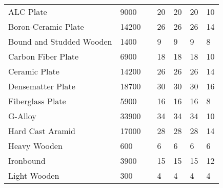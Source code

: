 \documentclass[twoside]{book}
\begin{document}
\begin{longtable}{p{1.25in}llp{3em}p{3em}p{3em}p{3em}}
  \\
  \hline
  \endhead
      
  \raggedright
           ALC Plate 
  &
   9000 
  &
  
  &
   20 
  &
   20 
  &
   20 
  &
   10 
  \tabularnewline
      
  \raggedright
           Boron-Ceramic Plate 
  &
   14200 
  &
  
  &
   26 
  &
   26 
  &
   26 
  &
   14 
  \tabularnewline
      
  \raggedright
           Bound and Studded Wooden
           
  &
   1400 
  &
  
  &
   9 
  &
   9 
  &
   9 
  &
   8 
  \tabularnewline
      
  \raggedright
           Carbon Fiber Plate 
  &
   6900 
  &
  
  &
   18 
  &
   18 
  &
   18 
  &
   10 
  \tabularnewline
      
  \raggedright
           Ceramic Plate 
  &
   14200 
  &
  
  &
   26 
  &
   26 
  &
   26 
  &
   14 
  \tabularnewline
      
  \raggedright
           Densematter Plate 
  &
   18700 
  &
  
  &
   30 
  &
   30 
  &
   30 
  &
   16 
  \tabularnewline
      
  \raggedright
           Fiberglass Plate 
  &
   5900 
  &
  
  &
   16 
  &
   16 
  &
   16 
  &
   8 
  \tabularnewline
      
  \raggedright
           G-Alloy 
  &
   33900 
  &
  
  &
   34 
  &
   34 
  &
   34 
  &
   10 
  \tabularnewline
      
  \raggedright
           Hard Cast Aramid 
  &
   17000 
  &
  
  &
   28 
  &
   28 
  &
   28 
  &
   14 
  \tabularnewline
      
  \raggedright
           Heavy Wooden 
  &
   600 
  &
  
  &
   6 
  &
   6 
  &
   6 
  &
   6 
  \tabularnewline
      
  \raggedright
           Ironbound 
  &
   3900 
  &
  
  &
   15 
  &
   15 
  &
   15 
  &
   12 
  \tabularnewline
      
  \raggedright
           Light Wooden 
  &
   300 
  &
  
  &
   4 
  &
   4 
  &
   4 
  &
   4 
  \tabularnewline
      

\end{longtable}
\end{document}
